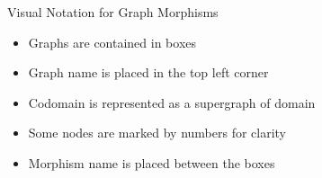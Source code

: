\documentclass{beamer}
\begin{document}
\begin{frame}{Visual Notation for Graph Morphisms}
\begin{center}
{\begin{tikzpicture}
                \end{tikzpicture}
                }
        \end{center}
        \begin{itemize}
            \item \alert{Graphs} are contained \alert{in boxes}
            \item \alert{Graph name} is placed in the \alert{top left corner}
            \item \alert{Codomain} is represented as a \alert{supergraph of domain}
            \item Some \alert{nodes} are marked by \alert{numbers} for clarity
            \item \alert{Morphism name} is placed \alert{between the boxes}
        \end{itemize}
\end{frame}
\end{document}
